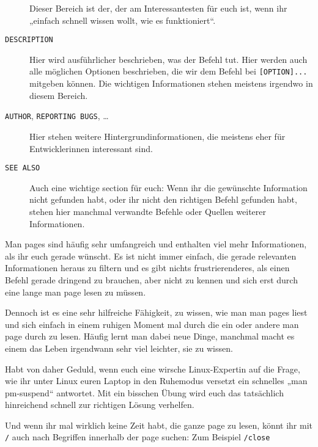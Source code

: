 \begin{praxis}
\begin{description}
              Dieser Bereich ist der, der am Interessantesten für euch ist, wenn ihr
              „einfach schnell wissen wollt, wie es funktioniert“.
        \item[\texttt{DESCRIPTION}]
              Hier wird ausführlicher beschrieben, was der Befehl tut. Hier werden
              auch alle möglichen Optionen beschrieben, die wir dem Befehl bei
              \texttt{[OPTION]...} mitgeben können. Die wichtigen Informationen
              stehen meistens irgendwo in diesem Bereich.
        \item[\texttt{AUTHOR}, \texttt{REPORTING BUGS}, \dots]
              Hier stehen weitere Hintergrundinformationen, die meistens eher für
              Entwicklerinnen interessant sind.
        \item[\texttt{SEE ALSO}]
              Auch eine wichtige section für euch: Wenn ihr die gewünschte
              Information nicht gefunden habt, oder ihr nicht den richtigen Befehl
              gefunden habt, stehen hier manchmal verwandte Befehle oder Quellen
              weiterer Informationen.
    \end{description}

    Man pages sind häufig sehr umfangreich und enthalten viel mehr Informationen,
    als ihr euch gerade wünscht. Es ist nicht immer einfach, die gerade relevanten
    Informationen heraus zu filtern und es gibt nichts frustrierenderes, als einen
    Befehl gerade dringend zu brauchen, aber nicht zu kennen und sich erst durch
    eine lange man page lesen zu müssen.

    Dennoch ist es eine sehr hilfreiche Fähigkeit, zu wissen, wie man man pages
    liest und sich einfach in einem ruhigen Moment mal durch die ein oder andere
    man page durch zu lesen. Häufig lernt man dabei neue Dinge, manchmal macht es
    einem das Leben irgendwann sehr viel leichter, sie zu wissen.

    Habt von daher Geduld, wenn euch eine wirsche Linux-Expertin auf die Frage, wie
    ihr unter Linux euren Laptop in den Ruhemodus versetzt ein schnelles „man
    pm-suspend“ antwortet. Mit ein bisschen Übung wird euch das tatsächlich
    hinreichend schnell zur richtigen Lösung verhelfen.
\end{praxis}

Und wenn ihr mal wirklich keine Zeit habt, die ganze page zu lesen, könnt ihr mit \texttt{/} auch nach Begriffen innerhalb der page suchen: Zum Beispiel \texttt{/close}

